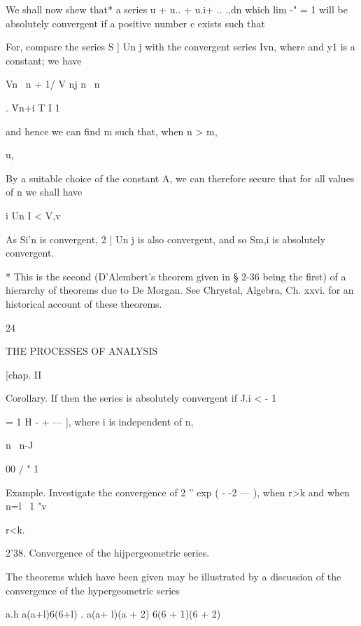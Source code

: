 We shall now shew that* a series u + u.. + u.i+ .. .,dn which lim -" =
1 will be absolutely convergent if a positive number c exists such
that

For, compare the series S ] Un j with the convergent series Ivn, where
and y1 is a constant; we have



Vn \ n + 1/ V nj n \ n

. \'Vn+i T I 1

and hence we can find m such that, when n > m,



u,






By a suitable choice of the constant A, we can therefore secure that
for all values of n we shall have

i Un I < V,v

As Si'n is convergent, 2 | Un j is also convergent, and so Sm,i is
absolutely convergent.

* This is the second (D'Alembert's theorem given in § 2-36 being the
first) of a hierarchy of theorems due to De Morgan. See Chrystal,
Algebra, Ch. xxvi. for an historical account of these theorems.



24



THE PROCESSES OF ANALYSIS



[chap. II






Corollary. If then the series is absolutely convergent if J.i < - 1



= 1 H - + — ], where i is independent of n,

n \ n-J



00 / " 1 \

Example. Investigate the convergence of 2 '' exp ( - -2 — ), when r>k
and when n=l \ 1 "v



r<k.

2'38. Convergence of the hijpergeometric series.

The theorems which have been given may be illustrated by a discussion
of the convergence of the hypergeometric series

  a.h a(a+l)6(6+l) . a(a+ l)(a + 2) 6(6 + 1)(6 + 2)

